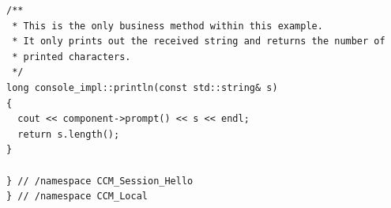 \begin{small}
\begin{verbatim}
/**
 * This is the only business method within this example.
 * It only prints out the received string and returns the number of 
 * printed characters.
 */
long console_impl::println(const std::string& s)
{
  cout << component->prompt() << s << endl;
  return s.length();
}

} // /namespace CCM_Session_Hello
} // /namespace CCM_Local
\end{verbatim}
\end{small}




